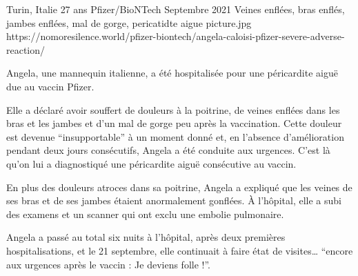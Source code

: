 {Turin, Italie}
{27 ans}
{Pfizer/BioNTech}
{Septembre 2021}
{Veines enflées, bras enflés, jambes enflées, mal de gorge, pericatidte aigue}
{picture.jpg}
{https://nomoresilence.world/pfizer-biontech/angela-caloisi-pfizer-severe-adverse-reaction/}
{

Angela, une mannequin italienne, a été hospitalisée pour une péricardite aiguë
due au vaccin Pfizer.

Elle a déclaré avoir souffert de douleurs à la poitrine, de veines enflées dans
les bras et les jambes et d'un mal de gorge peu après la vaccination. Cette
douleur est devenue “insupportable” à un moment donné et, en l'absence
d'amélioration pendant deux jours consécutifs, Angela a été conduite aux
urgences. C'est là qu'on lui a diagnostiqué une péricardite aiguë consécutive au
vaccin.

En plus des douleurs atroces dans sa poitrine, Angela a expliqué que les veines
de ses bras et de ses jambes étaient anormalement gonflées. À l'hôpital, elle a
subi des examens et un scanner qui ont exclu une embolie pulmonaire.

Angela a passé au total six nuits à l'hôpital, après deux premières
hospitalisations, et le 21 septembre, elle continuait à faire état de visites…
“encore aux urgences après le vaccin : Je deviens folle !”.

}
